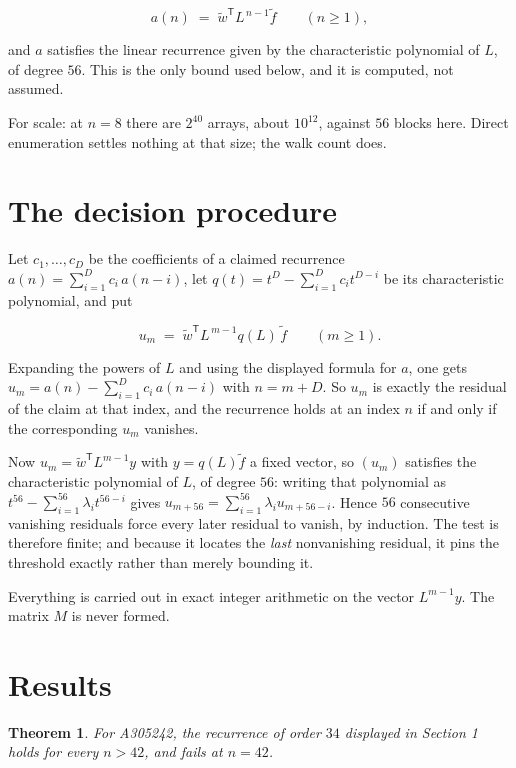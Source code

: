 \documentclass[11pt]{article}
\newtheorem{theorem}{Theorem}
\theoremstyle{definition}
\begin{document}
\[a(n) \;=\; \tilde w^{\mathsf T} L^{\,n-1} \tilde f \qquad (n \ge 1),\]

and $a$ satisfies the linear recurrence given by the characteristic polynomial of $L$, of degree $56$. This is the only bound used below, and it is computed, not assumed.

For scale: at $n = 8$ there are $2^{40}$ arrays, about $10^{12}$, against $56$ blocks here. Direct enumeration settles nothing at that size; the walk count does.

\section{The decision procedure}

Let $c_1,\dots,c_D$ be the coefficients of a claimed recurrence $a(n) = \sum_{i=1}^{D} c_i\,a(n-i)$, let $q(t) = t^{D} - \sum_{i=1}^{D} c_i t^{D-i}$ be its characteristic polynomial, and put

\[u_m \;=\; \tilde w^{\mathsf T} L^{\,m-1} q(L)\,\tilde f \qquad (m \ge 1).\]

Expanding the powers of $L$ and using the displayed formula for $a$, one gets $u_m = a(n) - \sum_{i=1}^{D} c_i\,a(n-i)$ with $n = m + D$. So $u_m$ is exactly the residual of the claim at that index, and the recurrence holds at an index $n$ if and only if the corresponding $u_m$ vanishes.

Now $u_m = \tilde w^{\mathsf T} L^{m-1} y$ with $y = q(L)\tilde f$ a fixed vector, so $(u_m)$ satisfies the characteristic polynomial of $L$, of degree $56$: writing that polynomial as $t^{56} - \sum_{i=1}^{56} \lambda_i t^{56-i}$ gives $u_{m+56} = \sum_{i=1}^{56} \lambda_i u_{m+56-i}$. Hence $56$ consecutive vanishing residuals force every later residual to vanish, by induction. The test is therefore finite; and because it locates the {\itshape last} nonvanishing residual, it pins the threshold exactly rather than merely bounding it.

Everything is carried out in exact integer arithmetic on the vector $L^{m-1}y$. The matrix $M$ is never formed.

\section{Results}

\begin{theorem} For A305242, the recurrence of order $34$ displayed in Section 1 holds for every $n > 42$, and fails at $n = 42$.\end{theorem}
\end{document}
